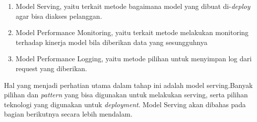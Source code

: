\begin{enumerate}
  \item Model Serving, yaitu terkait metode bagaimana model yang dibuat di-\textit{deploy} agar bisa diakses pelanggan.
  \item Model Performance Monitoring, yaitu terkait metode melakukan monitoring terhadap kinerja model bila diberikan data yang sesungguhnya
  \item Model Performance Logging, yaitu metode pilihan untuk menyimpan log dari request yang diberikan.
\end{enumerate}

Hal yang menjadi perhatian utama dalam tahap ini adalah model serving.Banyak pilihan dan \textit{pattern} yang bisa digunakan untuk melakukan serving, serta pilihan teknologi yang digunakan untuk \textit{deployment}.
Model Serving akan dibahas pada bagian berikutnya secara lebih mendalam.